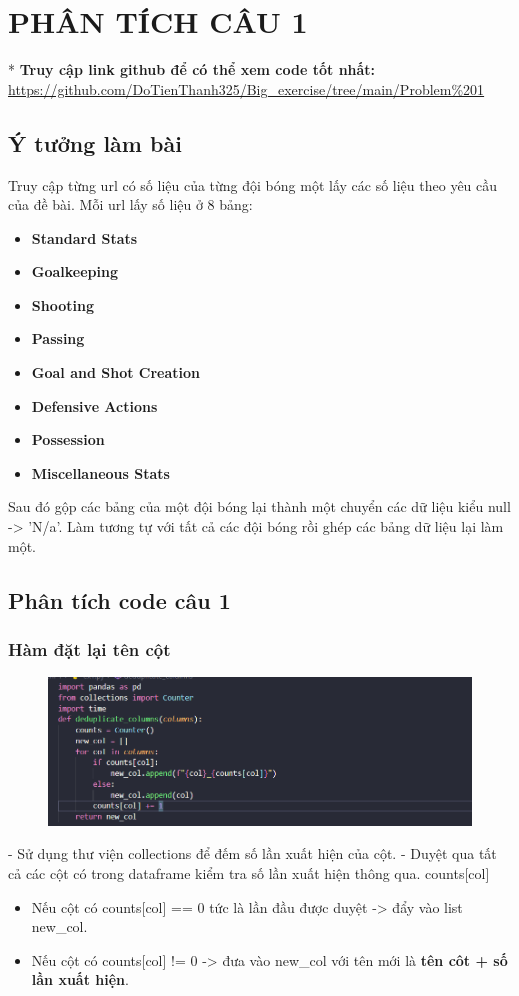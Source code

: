 \section{PHÂN TÍCH CÂU 1}
\setcounter{section}{1}
* \textbf{Truy cập link github để có thể xem code tốt nhất:}  \url{https://github.com/DoTienThanh325/Big_exercise/tree/main/Problem%201}
\subsection{Ý tưởng làm bài}
Truy cập từng url có số liệu của từng đội bóng một lấy các số liệu theo yêu cầu của đề bài. Mỗi url lấy số liệu ở 8 bảng: 
\begin{itemize}
    \item \textbf{Standard Stats} 
    \item \textbf{Goalkeeping}
    \item \textbf{Shooting}
    \item \textbf{Passing}
    \item \textbf{Goal and Shot Creation}
    \item \textbf{Defensive Actions}
    \item \textbf{Possession}
    \item \textbf{Miscellaneous Stats}
\end{itemize}
Sau đó gộp các bảng của một đội bóng lại thành một chuyển các dữ liệu kiểu null -> 'N/a'. Làm tương tự với tất cả các đội bóng rồi ghép các bảng dữ liệu lại làm một.
\subsection{Phân tích code câu 1}
\vspace{6pt}
\subsubsection{Hàm đặt lại tên cột}
    \begin{figure}[h]
        \centering
        \includegraphics[width=1\textwidth]{img/ham_rename_col.png}
    \end{figure}
    - Sử dụng thư viện collections để đếm số lần xuất hiện của cột.
    - Duyệt qua tất cả các cột có trong dataframe kiểm tra số lần xuất hiện thông qua. counts[col]
    \begin{itemize}
        \item Nếu cột có counts[col] == 0 tức là lần đầu được duyệt -> đẩy vào list new\_col.
        \item Nếu cột có counts[col] != 0 -> đưa vào new\_col với tên mới là \textbf{tên côt + số lần xuất hiện}.
    \end{itemize}
    
